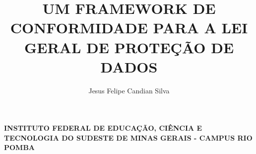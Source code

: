 \documentclass[
	12pt,				%
	openright,			%
	oneside,			%
	a4paper,			%
	english,			%
	french,				%
	spanish,			%
	brazil,				%
	]{abntex2}
\author{Jesus Felipe Candian Silva}
\title{UM FRAMEWORK DE CONFORMIDADE PARA A LEI GERAL DE PROTEÇÃO DE DADOS}
\begin{document}
\frenchspacing 


\begin{center}
\textbf{ 
INSTITUTO FEDERAL DE EDUCAÇÃO, CIÊNCIA E TECNOLOGIA DO SUDESTE DE MINAS GERAIS - CAMPUS RIO POMBA}
\end{center}

\imprimircapa

\imprimirfolhaderosto*

\end{document}
